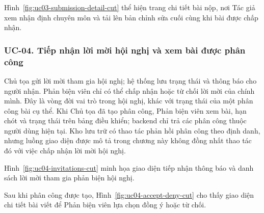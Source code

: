 Hình~\ref{fig:uc03-submission-detail-cut} thể hiện trang chi tiết bài nộp, nơi Tác giả xem nhận định chuyên môn và tải lên bản chỉnh sửa cuối cùng khi bài được chấp nhận.

\subsubsection{UC-04. Tiếp nhận lời mời hội nghị và xem bài được phân công}

Chủ tọa gửi lời mời tham gia hội nghị; hệ thống lưu trạng thái và thông báo cho người nhận. Phản biện viên chỉ có thể chấp nhận hoặc từ chối lời mời của chính mình. Đây là vòng đời vai trò trong hội nghị, khác với trạng thái của một phân công bài cụ thể. Khi Chủ tọa đã tạo phân công, Phản biện viên xem bài, hạn chót và trạng thái trên bảng điều khiển; backend chỉ trả các phân công thuộc người dùng hiện tại. Kho lưu trữ có thao tác phản hồi phân công theo định danh, nhưng luồng giao diện được mô tả trong chương này không đồng nhất thao tác đó với việc chấp nhận lời mời hội nghị.


Hình~\ref{fig:uc04-invitations-cut} minh họa giao diện tiếp nhận thông báo và danh sách lời mời tham gia phản biện hội nghị.


Sau khi phân công được tạo, Hình~\ref{fig:uc04-accept-deny-cut} cho thấy giao diện chi tiết bài viết để Phản biện viên lựa chọn đồng ý hoặc từ chối.

